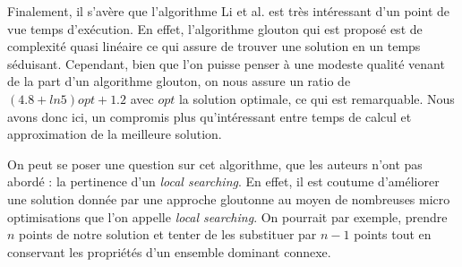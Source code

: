 
Finalement, il s'avère que l'algorithme Li et al. est très intéressant d'un point de vue temps d'exécution. En effet, l'algorithme glouton qui est proposé est de complexité quasi linéaire ce qui assure de trouver une solution en un temps séduisant. Cependant, bien que l'on puisse penser à une modeste qualité venant de la part d'un algorithme glouton, on nous assure un ratio de $(4.8+ln5)opt+1.2$ avec $opt$ la solution optimale, ce qui est remarquable. Nous avons donc ici, un compromis plus qu'intéressant entre temps de calcul et approximation de la meilleure solution.

On peut se poser une question sur cet algorithme, que les auteurs n'ont pas abordé : la pertinence d'un \textit{local searching}. En effet, il est coutume d'améliorer une solution donnée par une approche gloutonne au moyen de nombreuses micro optimisations que l'on appelle \textit{local searching}. On pourrait par exemple, prendre $n$ points de notre solution et tenter de les substituer par $n-1$ points tout en conservant les propriétés d'un ensemble dominant connexe.